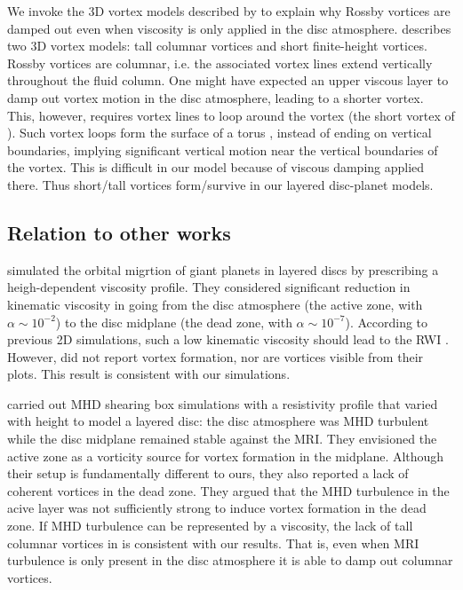 We invoke the 3D vortex models described by \cite{barranco05} to
explain why Rossby vortices are damped out even when viscosity is only
applied in the disc atmosphere.  \citeauthor{barranco05} describes two
3D vortex models: tall columnar vortices and short finite-height vortices. 
Rossby vortices are columnar, i.e. the associated vortex lines
extend vertically throughout the fluid column. One might have expected
an upper viscous layer to damp out vortex motion in the disc atmosphere, leading to a shorter
vortex. This, however, requires vortex lines to loop around the
vortex (the short vortex of \citeauthor{barranco05}). Such  
vortex loops form the surface of a torus \citep[see, for 
  example, Fig. 1 in][]{barranco05}, instead of ending on 
vertical boundaries, implying significant vertical
motion near the vertical boundaries of the vortex. This is 
difficult in our model because of viscous damping applied there. Thus 
short/tall vortices form/survive in our layered disc-planet
models.     

\subsection{Relation to other works}
\cite{pierens10} simulated the orbital migrtion of giant planets in
layered discs by prescribing a heigh-dependent viscosity profile. They
considered significant reduction in kinematic viscosity in going from
the disc atmosphere (the active zone, with $\alpha\sim10^{-2}$) to the
disc midplane (the dead zone, with $\alpha\sim10^{-7}$). According to
previous 2D simulations, such a low kinematic viscosity should lead to
the RWI \citep{valborro06,valborro07}. However, \citeauthor{pierens10}
did not report vortex formation, nor are vortices visible from their
plots. This result is consistent with our simulations. 

\cite{oishi09} carried out MHD shearing box simulations with 
a resistivity profile that varied with height to model a
layered disc: the disc atmosphere was MHD turbulent while the disc
midplane remained stable against the MRI. They envisioned the active
zone as a vorticity source for vortex formation in the midplane.  
Although their setup is fundamentally different to ours, they also
reported a lack of coherent vortices in the dead zone. They argued
that the MHD turbulence in the acive layer was not sufficiently strong
to induce vortex formation in the dead zone. If MHD turbulence can be
represented by a viscosity, the lack of tall columnar vortices in
\citeauthor{oishi09} is consistent with our results. That is,
even when MRI turbulence is only present in the disc atmosphere it is
able to damp out columnar vortices.     


